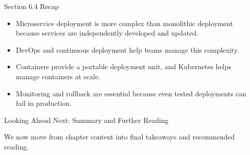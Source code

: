 \begin{frame}{Section 6.4 Recap}
\begin{itemize}
    \item Microservice deployment is more complex than monolithic deployment because services are independently developed and updated.
    \item DevOps and continuous deployment help teams manage this complexity.
    \item Containers provide a portable deployment unit, and Kubernetes helps manage containers at scale.
    \item Monitoring and rollback are essential because even tested deployments can fail in production.
\end{itemize}
\end{frame}

\begin{frame}{Looking Ahead}
\centering
\Large Next: Summary and Further Reading

\vspace{1em}

\normalsize
We now move from chapter content into final takeaways and recommended reading.
\end{frame}
